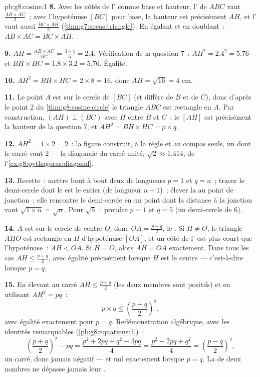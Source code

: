 \begin{solution}{pb:g8:cosine:1}
\textbf{8.} Avec les côtés de l' comme base et hauteur,
l' de $ABC$ vaut $\frac{AB \times AC}{2}$~; avec l'hypoténuse
$[BC]$ pour base, la hauteur est précisément $AH$, et l' vaut
aussi $\frac{BC \times AH}{2}$ (\cref{thm:g7:areas:triangle}). En
égalant et en doublant~: $AB \times AC = BC \times AH$.

\textbf{9.} $AH = \frac{AB \times AC}{BC} = \frac{3 \times 4}{5}
= 2.4$. Vérification de la question 7~:
$AH^2 = 2.4^2 = 5.76$ et $BH \times HC = 1.8 \times 3.2 = 5.76$.
Égalité.

\textbf{10.} $AH^2 = BH \times HC = 2 \times 8 = 16$, donc
$AH = \sqrt{16} = 4$ cm.

\textbf{11.} Le point $A$ est sur le cercle de  $[BC]$ (et
diffère de $B$ et de $C$), donc d'après le point 2 du
\cref{thm:g8:cosine:circle} le triangle $ABC$ est rectangle en $A$.
Par construction, $(AH) \perp (BC)$ avec $H$ entre $B$ et $C$~: le
 $[AH]$ est précisément la hauteur de la question 7, et
$AH^2 = BH \times HC = p \times q$.

\textbf{12.} $AH^2 = 1 \times 2 = 2$~: la figure construit, à la
règle et au compas seuls, un  dont le carré vaut $2$ --- la
diagonale du carré unité, $\sqrt2 \approx 1.414$, de
l'\cref{ex:g8:pythagoras:diagonal}.

\textbf{13.} Recette~: mettre bout à bout deux  de longueurs
$p = 1$ et $q = n$~; tracer le demi-cercle dont le  est le
 entier (de longueur $n + 1$)~; élever la  au
point de jonction~; elle rencontre le demi-cercle en un point dont
la distance à la jonction vaut $\sqrt{1 \times n} = \sqrt n$. Pour
$\sqrt5$~: prendre $p = 1$ et $q = 5$ (un demi-cercle de 
$6$).

\textbf{14.} $A$ est sur le cercle de centre $O$, donc
$OA = \frac{p+q}{2}$, le . Si $H \neq O$, le triangle $AHO$ est
rectangle en $H$ d'hypoténuse $[OA]$, et un côté de l'
est plus court que l'hypoténuse~: $AH < OA$. Si $H = O$, alors
$AH = OA$ exactement. Dans tous les cas
$AH \leq \frac{p+q}{2}$, avec égalité précisément lorsque $H$ est le
centre --- c'est-à-dire lorsque $p = q$.

\textbf{15.} En élevant au carré $AH \leq \frac{p+q}{2}$ (les deux
membres sont positifs) et en utilisant $AH^2 = pq$~:
\[
p \times q \leq \left(\frac{p+q}{2}\right)^2 ,
\]
avec égalité exactement pour $p = q$. Redémonstration algébrique,
avec les identités remarquables (\cref{pb:g8:equations:1})~:
\[
\left(\frac{p+q}{2}\right)^2 - pq
= \frac{p^2 + 2pq + q^2 - 4pq}{4}
= \frac{p^2 - 2pq + q^2}{4}
= \left(\frac{p-q}{2}\right)^2 ,
\]
un carré, donc jamais négatif --- et nul exactement lorsque
$p = q$. La  de deux nombres ne dépasse jamais
leur .
\end{solution}
